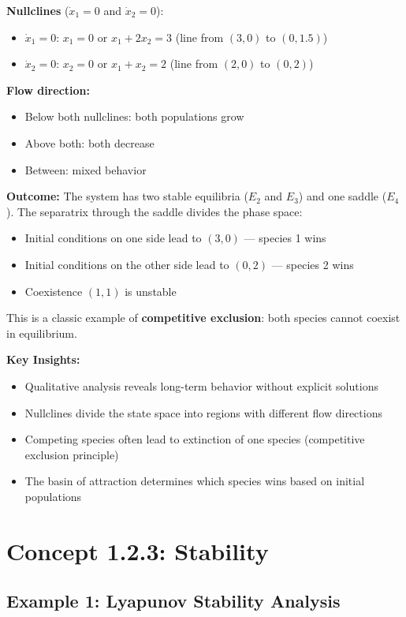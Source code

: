\documentclass[11pt,a4paper]{article}
\begin{document}
\textbf{Nullclines} ($\dot{x}_1 = 0$ and $\dot{x}_2 = 0$):
\begin{itemize}
\item $\dot{x}_1 = 0$: $x_1 = 0$ or $x_1 + 2x_2 = 3$ (line from $(3,0)$ to $(0, 1.5)$)
\item $\dot{x}_2 = 0$: $x_2 = 0$ or $x_1 + x_2 = 2$ (line from $(2,0)$ to $(0, 2)$)
\end{itemize}

\textbf{Flow direction:}
\begin{itemize}
\item Below both nullclines: both populations grow
\item Above both: both decrease
\item Between: mixed behavior
\end{itemize}

\textbf{Outcome:} The system has two stable equilibria ($E_2$ and $E_3$) and one saddle ($E_4$). The separatrix through the saddle divides the phase space:
\begin{itemize}
\item Initial conditions on one side lead to $(3, 0)$ — species 1 wins
\item Initial conditions on the other side lead to $(0, 2)$ — species 2 wins
\item Coexistence $(1,1)$ is unstable
\end{itemize}

This is a classic example of \textbf{competitive exclusion}: both species cannot coexist in equilibrium.

\textbf{Key Insights:}
\begin{itemize}
\item Qualitative analysis reveals long-term behavior without explicit solutions
\item Nullclines divide the state space into regions with different flow directions
\item Competing species often lead to extinction of one species (competitive exclusion principle)
\item The basin of attraction determines which species wins based on initial populations
\end{itemize}

\section{Concept 1.2.3: Stability}

\subsection{Example 1: Lyapunov Stability Analysis}
\end{document}
